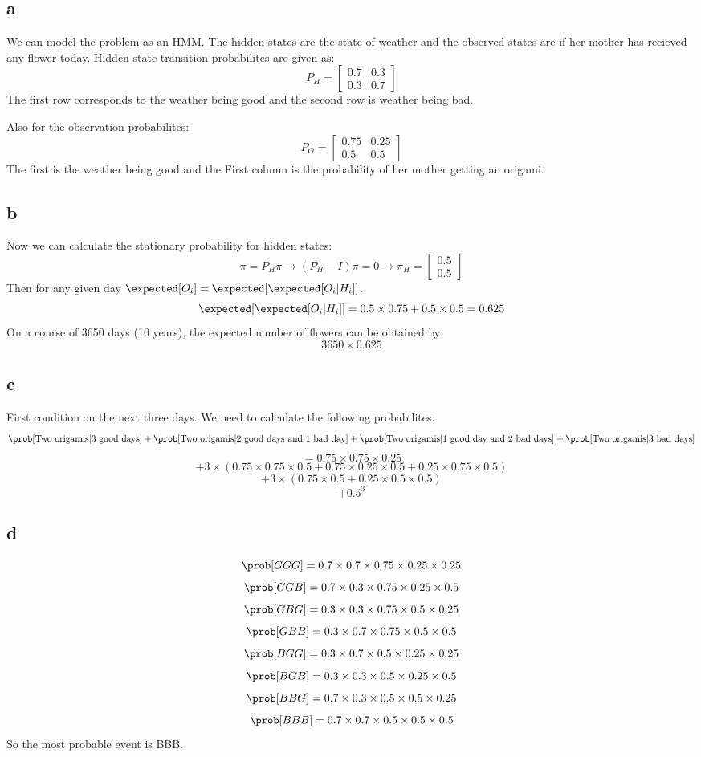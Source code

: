 \subsection{a}
We can model the problem as an HMM. The hidden states are the state of weather and the observed states are if her mother has recieved any flower today. 
Hidden state transition probabilites are given as:
$$
P_H = \begin{bmatrix}0.7&0.3\\0.3&0.7\end{bmatrix}
$$
The first row corresponds to the weather being good and the second row is weather being bad.

\noindent Also for the observation probabilites:
$$
P_O = \begin{bmatrix}0.75&0.25\\0.5&0.5\end{bmatrix}
$$
The first is the weather being good and the First column is the probability of her mother getting an origami.
\subsection{b}
Now we can calculate the stationary probability for hidden states:
$$
\pi = P_H\pi \rightarrow (P_H - I)\pi = 0 \rightarrow \pi_H = \begin{bmatrix}0.5\\0.5\end{bmatrix}
$$
Then for any given day $\expected[O_i] = \expected[\expected[O_i|H_i]]$.
$$
\expected[\expected[O_i|H_i]] = 0.5\times0.75 + 0.5\times0.5 = 0.625
$$
On a course of 3650 days (10 years), the expected number of flowers can be obtained by:
$$
3650\times0.625
$$
\subsection{c}
First condition on the next three days. We need to calculate the following probabilites.
$$
\prob[\text{Two origamis} | \text{3 good days}] + \prob[\text{Two origamis} | \text{2 good days and 1 bad day}] + \prob[\text{Two origamis} | \text{1 good day and 2 bad days}] + \prob[\text{Two origamis} | \text{3 bad days}] 
$$
$$
= 0.75\times0.75\times0.25
$$
$$
+ 3\times(0.75\times0.75\times0.5 + 0.75\times0.25\times0.5 + 0.25\times0.75\times0.5)
$$
$$
+ 3\times(0.75\times0.5 + 0.25\times0.5\times0.5)
$$
$$
+ 0.5^3
$$
\subsection{d}
$$
\prob[GGG] = 0.7\times0.7\times0.75\times0.25\times0.25
$$
$$
\prob[GGB] = 0.7\times0.3\times0.75\times0.25\times0.5
$$
$$
\prob[GBG] = 0.3\times0.3\times0.75\times0.5\times0.25
$$
$$
\prob[GBB] = 0.3\times0.7\times0.75\times0.5\times0.5
$$
$$
\prob[BGG] = 0.3\times0.7\times0.5\times0.25\times0.25
$$
$$
\prob[BGB] = 0.3\times0.3\times0.5\times0.25\times0.5
$$
$$
\prob[BBG] = 0.7\times0.3\times0.5\times0.5\times0.25
$$
$$
\prob[BBB] = 0.7\times0.7\times0.5\times0.5\times0.5
$$
So the most probable event is BBB.
